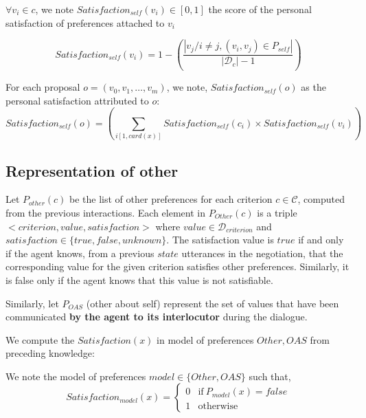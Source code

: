 \documentclass{article}
\begin{document}
	
	$\forall v_i \in c$, we note $Satisfaction_{self}(v_i)\in[0, 1]$ the score of the personal satisfaction of preferences attached to $v_i$ 
	
	 $$Satisfaction_{self}(v_i) = 1 - \left(\frac{|v_j / i \not= j, (v_i,v_j) \in P_{self}|}{|\mathcal{D}_c|-1}\right)$$

	
	For each proposal $o=(v_0,v_1,\ldots,v_m)$, we note, $Satisfaction_{self}(o)$ as the personal satisfaction attributed to $o$:  
	$$Satisfaction_{self}(o) = \left(\sum_{i[1,card(x)]} Satisfaction_{self}(c_i)\times  Satisfaction_{self}(v_i)\right)$$
	
		
	
	\subsection{Representation of other}
	Let $P_{other}(c)$ be the list of other preferences for each criterion $c \in \mathcal{C}$, computed from the previous interactions. Each element in $P_{Other}(c)$ is a triple $<criterion,value,satisfaction>$ where $value \in \mathcal{D}_{criterion}$ and $satisfaction\in\{true,false,unknown\}$. The satisfaction value is $true$ if and only if the agent knows, from a previous $state$ utterances in the negotiation, that the corresponding value for the given criterion satisfies other preferences. Similarly, it is false only if the agent knows that this value is not satisfiable.
	
	Similarly, let $P_{OAS}$ (other about self) represent the set of values that have been communicated \textbf{by the agent to its interlocutor} during the dialogue.
	
	
	We compute the $Satisfaction(x)$ in model of preferences $Other, OAS$ from preceding knowledge: 
	
	We note the model of preferences $ model \in \{Other, OAS\}$  such that,
		$$Satisfaction_{model}(x) = \left\{\begin{array}{ll}
			0 & \mathrm{if\ }P_{model}(x)= false\\
			1 & \mathrm{otherwise}
			\end{array}\right.$$
	
	
\end{document}
